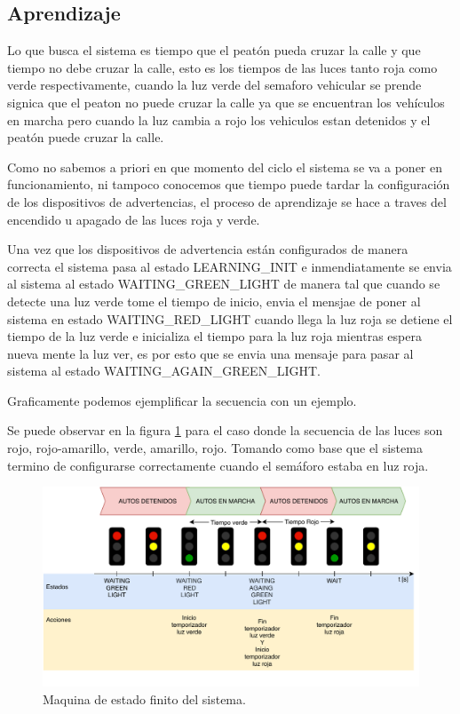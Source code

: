 \subsection{Aprendizaje}
Lo que busca el sistema es tiempo que el peatón pueda cruzar la calle y  que tiempo no debe cruzar la calle, esto es los tiempos de las luces tanto roja como verde respectivamente, cuando la luz verde del semaforo vehicular se prende signica que el peaton no puede cruzar la calle ya que se encuentran los vehículos en marcha pero cuando la luz cambia a rojo los vehiculos estan detenidos y el peatón puede cruzar la calle.

Como no sabemos a priori en que momento del ciclo el sistema se va a poner en funcionamiento, ni tampoco conocemos que tiempo puede tardar la configuración de los dispositivos de advertencias, el proceso de aprendizaje se hace a traves del encendido u apagado de las luces roja y verde.

Una vez que los dispositivos de advertencia están configurados de manera correcta el sistema pasa al estado LEARNING\_INIT e inmendiatamente se envia al sistema al estado WAITING\_GREEN\_LIGHT  de manera tal que cuando se detecte una luz verde tome el tiempo de inicio, envia el mensjae de poner al sistema en estado WAITING\_RED\_LIGHT cuando llega la luz roja se detiene el tiempo de la luz verde e inicializa el tiempo para la luz roja mientras espera nueva mente la luz ver, es por esto que se envia una mensaje para pasar al sistema al estado WAITING\_AGAIN\_GREEN\_LIGHT. 

Graficamente podemos ejemplificar la secuencia con un ejemplo.

Se puede observar en la figura  \ref{fig:digramaGraficoCambioSemaforo} para el caso donde la secuencia de las luces son rojo, rojo-amarillo, verde, amarillo, rojo.
Tomando como base que el sistema termino de configurarse correctamente cuando el semáforo estaba en luz roja.

\begin{figure}[h]
	\centering
	\includegraphics[scale=.7]{./Figures/digramaGraficoCambioSemaforo.pdf}
	\caption{Maquina de estado finito del sistema.}
	\label{fig:digramaGraficoCambioSemaforo}
\end{figure}

